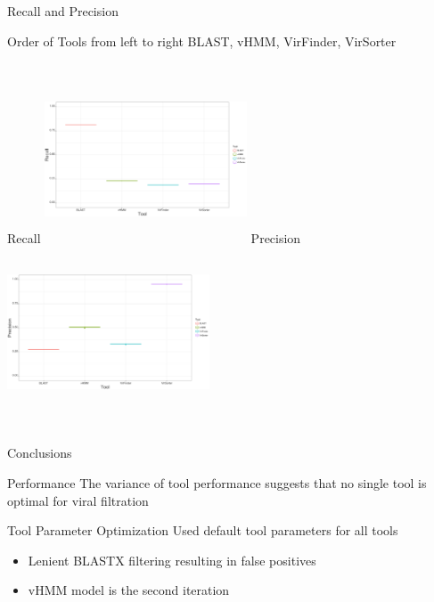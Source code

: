 \documentclass[11pt]{beamer}
\begin{document}
	\begin{frame}{Recall and Precision}
	
	\begin{block}{Order of Tools}
	\tiny{from left to right}
	\center
	\large{BLAST, vHMM, VirFinder, VirSorter}
	\end{block}
	\begin{columns}
	\center
	Recall
	\includegraphics[height=5cm, width=6cm]{Recall.png}
	\center
	Precision
	\includegraphics[height=5cm, width=6cm]{Precision.png}
	\end{columns}
	\end{frame}
	
	\begin{frame}{Conclusions}
	
	\begin{block}{Performance}
	The variance of tool performance suggests that no single tool is optimal for viral filtration
	\end{block}
	
	
	\begin{block}{Tool Parameter Optimization}
	Used default tool parameters for all tools
	\begin{itemize}
	\item Lenient BLASTX filtering resulting in false positives
	\item vHMM model is the second iteration
	\end{itemize}
	\end{block}
	
	
	\end{frame}
	
\end{document}

